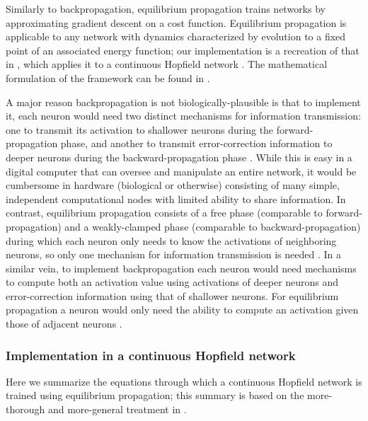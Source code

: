 \documentclass[utf8]{frontiersSCNS}
\begin{document}
Similarly to backpropagation, equilibrium propagation \citep{scellier17} trains networks by approximating gradient descent on a cost function. Equilibrium propagation is applicable to any network with dynamics characterized by evolution to a fixed point of an associated energy function; our implementation is a recreation of that in \citep{scellier17}, which applies it to a continuous Hopfield network \citep{hopfield1984}. The mathematical formulation of the framework can be found in \citep{scellier17}.

A major reason backpropagation is not biologically-plausible is that to implement it, each neuron would need two distinct mechanisms for information transmission: one to transmit its activation to shallower neurons during the forward-propagation phase, and another to transmit error-correction information to deeper neurons during the backward-propagation phase \citep{bengio2015}. While this is easy in a digital computer that can oversee and manipulate an entire network, it would be cumbersome in hardware (biological or otherwise) consisting of many simple, independent computational nodes with limited ability to share information. In contrast, equilibrium propagation consists of a free phase (comparable to forward-propagation) and a weakly-clamped phase (comparable to backward-propagation) during which each neuron only needs to know the activations of neighboring neurons, so only one mechanism for information transmission is needed \citep{scellier17}. In a similar vein, to implement backpropagation each neuron would need mechanisms to compute both an activation value using activations of deeper neurons and error-correction information using that of shallower neurons. For equilibrium propagation a neuron would only need the ability to compute an activation given those of adjacent neurons \citep{scellier17}.

\subsubsection{Implementation in a continuous Hopfield network}

Here we summarize the equations through which a continuous Hopfield network is trained using equilibrium propagation; this summary is based on the more-thorough and more-general treatment in \citep{scellier17}.
\end{document}
